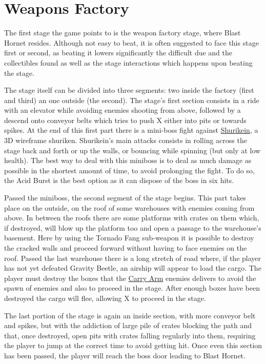 \section{Weapons Factory}
The first stage the game points to is the weapon factory stage, where Blast Hornet resides. Although not easy to beat, it is often suggested to face this stage first or second, as beating it lowers significantly the difficult due and the collectibles found as well as the  stage interactions which happens upon beating the stage.

The stage itself can be divided into three segments: two inside the factory (first and third) an one outside (the second). The stage's first section consists in a ride with an elevator while avoiding enemies shooting from above, followed by a descend onto conveyor belts which tries to push X either into pits or towards spikes. At the end of this first part there is a mini-boss fight against \hyperlink{miniboss:Shurikein}{Shurikein}, a 3D wireframe shuriken. Shurikein's main attacks consists in rolling across the stage back and forth or up the walls, or bouncing while spinning (but only at low health). The best way to deal with this miniboss is to deal as much damage as possible in the shortest amount of time, to avoid prolonging the fight. To do so, the Acid Burst is the best option as it can dispose of the boss in six hits. 

Passed the miniboss, the second segment of the stage begins. This part takes place on the outside, on the roof of some warehouses with enemies coming from above. In between the roofs there are some platforms with crates on them which, if destroyed, will blow up the platform too and open a passage to the warehouse's basement. Here by using  the Tornado Fang sub-weapon it is possible to destroy the cracked walls and proceed forward without having to face enemies on the roof. Passed the last warehouse there is a long stretch of road where, if the player has not yet defeated Gravity Beetle, an airship will appear to load the cargo. The player must destroy the boxes that the \hyperlink{enem:Carry_Arm}{Carry Arm} enemies delivers to avoid the spawn of enemies and also to proceed in the stage. After enough boxes have been destroyed the cargo will flee, allowing X to proceed in the stage.

The last portion of the stage is again an inside section, with more conveyor belt and spikes, but with the addiction of large pile of crates blocking the path and that, once destroyed, open pits with crates falling regularly into them, requiring the player to jump at the correct time to avoid getting hit. Once even this section has been passed, the player will reach the boss door leading to Blast Hornet.

